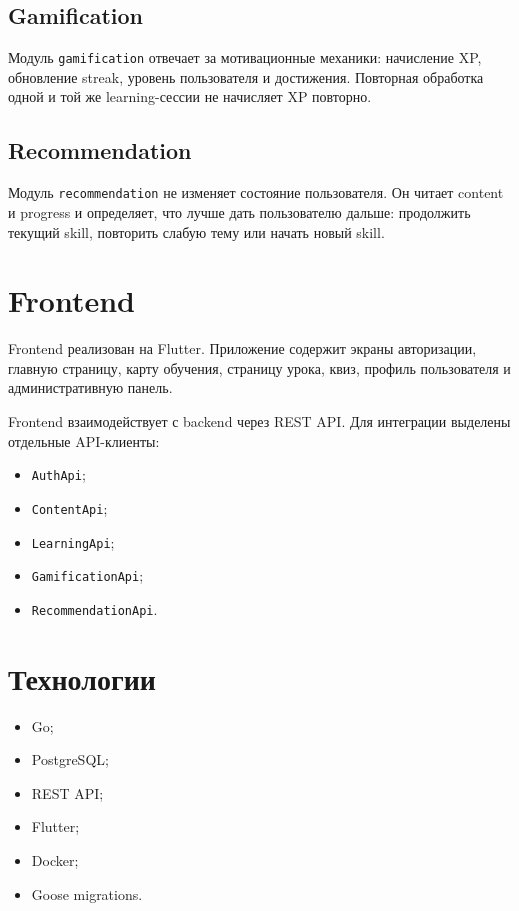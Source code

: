 \documentclass[12pt,a4paper]{article}
\begin{document}
\subsection*{Gamification}

Модуль \texttt{gamification} отвечает за мотивационные механики: начисление XP,
обновление streak, уровень пользователя и достижения. Повторная обработка одной
и той же learning-сессии не начисляет XP повторно.

\subsection*{Recommendation}

Модуль \texttt{recommendation} не изменяет состояние пользователя. Он читает
content и progress и определяет, что лучше дать пользователю дальше: продолжить
текущий skill, повторить слабую тему или начать новый skill.

\section{Frontend}

Frontend реализован на Flutter. Приложение содержит экраны авторизации,
главную страницу, карту обучения, страницу урока, квиз, профиль пользователя и
административную панель.

Frontend взаимодействует с backend через REST API. Для интеграции выделены
отдельные API-клиенты:

\begin{itemize}
    \item \texttt{AuthApi};
    \item \texttt{ContentApi};
    \item \texttt{LearningApi};
    \item \texttt{GamificationApi};
    \item \texttt{RecommendationApi}.
\end{itemize}

\section{Технологии}

\begin{itemize}
    \item Go;
    \item PostgreSQL;
    \item REST API;
    \item Flutter;
    \item Docker;
    \item Goose migrations.
\end{itemize}
\end{document}

